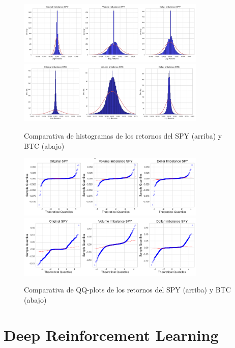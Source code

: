 \documentclass[a4paper,12pt]{report}
\begin{document}
\begin{figure}[H]
    \centering
    \includegraphics[width=0.8\textwidth]{figures/SPY_histogram_comparation.png}
    \includegraphics[width=0.8\textwidth]{figures/BTC_histogram_comparation.png}
    \caption{Comparativa de histogramas de los retornos del SPY (arriba) y BTC (abajo)}
    \label{fig:histogram_comparison}
\end{figure}

\begin{figure}[H]
    \centering
    \includegraphics[width=0.8\textwidth]{figures/SPY_qq_comparison.png}
    \includegraphics[width=0.8\textwidth]{figures/BTC_qq_comparison.png}
    \caption{Comparativa de QQ-plots de los retornos del SPY (arriba) y BTC (abajo)}
    \label{fig:qqplot_comparison}
\end{figure}

\chapter{Deep Reinforcement Learning}
\end{document}
